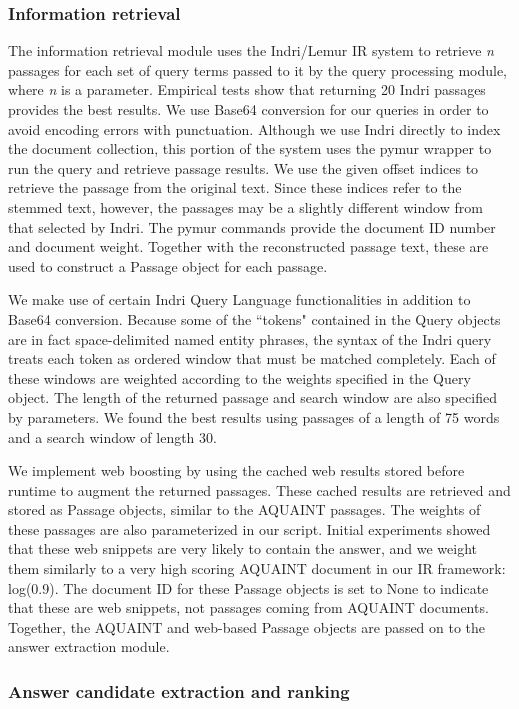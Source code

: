 \documentclass[11pt]{article}
\begin{document}
\subsubsection{Information retrieval}

The information retrieval module uses the Indri/Lemur IR system to retrieve \emph{n} passages for each set of query terms passed to it by the query processing module, where \emph{n} is a parameter. Empirical tests show that returning 20 Indri passages provides the best results. We use Base64 conversion for our queries in order to avoid encoding errors with punctuation. Although we use Indri directly to index the document collection, this portion of the system uses the pymur wrapper to run the query and retrieve passage results. We use the given offset indices to retrieve the passage from the original text. Since these indices refer to the stemmed text, however, the passages may be a slightly different window from that selected by Indri. The pymur commands provide the document ID number and document weight. Together with the reconstructed passage text, these are used to construct a Passage object for each passage. 

We make use of certain Indri Query Language functionalities in addition to Base64 conversion. Because some of the ``tokens" contained in the Query objects are in fact space-delimited named entity phrases, the syntax of the Indri query treats each token as ordered window that must be matched completely. Each of these windows are weighted according to the weights specified in the Query object. The length of the returned passage and search window are also specified by parameters. We found the best results using passages of a length of 75 words and a search window of length 30. 

We implement web boosting by using the cached web results stored before runtime to augment the returned passages. These cached results are retrieved and stored as Passage objects, similar to the AQUAINT passages. The weights of these passages are also parameterized in our script. Initial experiments showed that these web snippets are very likely to contain the answer, and we weight them similarly to a very high scoring AQUAINT document in our IR framework: log(0.9).  The document ID for these Passage objects is set to None to indicate that these are web snippets, not passages coming from AQUAINT documents.  Together, the AQUAINT and web-based Passage objects are passed on to the answer extraction module. 


\subsubsection{Answer candidate extraction and ranking}
\end{document}

